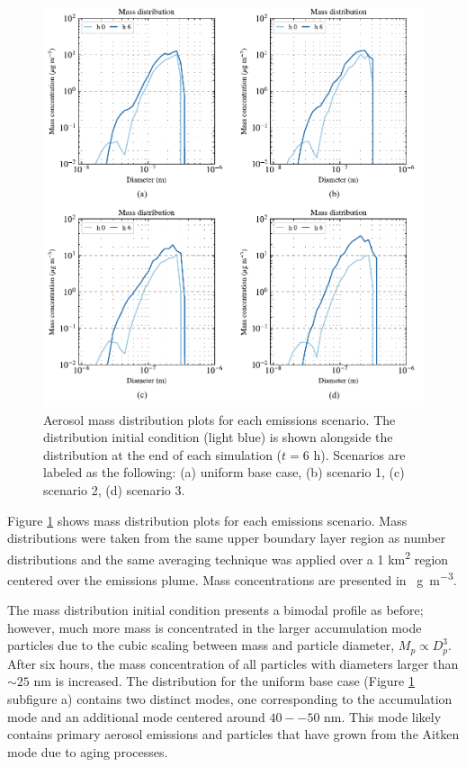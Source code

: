 \begin{figure}[!t]
  \centering
    \includegraphics[width=\textwidth]{figures/chapter5/mass-distribution-plots.pdf}
    \caption{Aerosol mass distribution plots for each emissions scenario. The distribution initial condition (light blue) is shown alongside the distribution at the end of each simulation ($t=6$ h). Scenarios are labeled as the following: (a) uniform base case, (b) scenario 1, (c) scenario 2, (d) scenario 3.}
    \label{fig:mass-dists}
\end{figure}

Figure \ref{fig:mass-dists} shows mass distribution plots for each emissions scenario. Mass distributions were taken from the same upper boundary layer region as number distributions and the same averaging technique was applied over a 1 \si{km^2} region centered over the emissions plume. Mass concentrations are presented in \si{\mu g.m^{-3}}. 

The mass distribution initial condition presents a bimodal profile as before; however, much more mass is concentrated in the larger accumulation mode particles due to the cubic scaling between mass and particle diameter, $M_p \propto D_p^3$. After six hours, the mass concentration of all particles with diameters larger than $\sim25$ nm is increased. The distribution for the uniform base case (Figure \ref{fig:mass-dists} subfigure a) contains two distinct modes, one corresponding to the accumulation mode and an additional mode centered around $40--50$ nm. This mode likely contains primary aerosol emissions and particles that have grown from the Aitken mode due to aging processes. 


